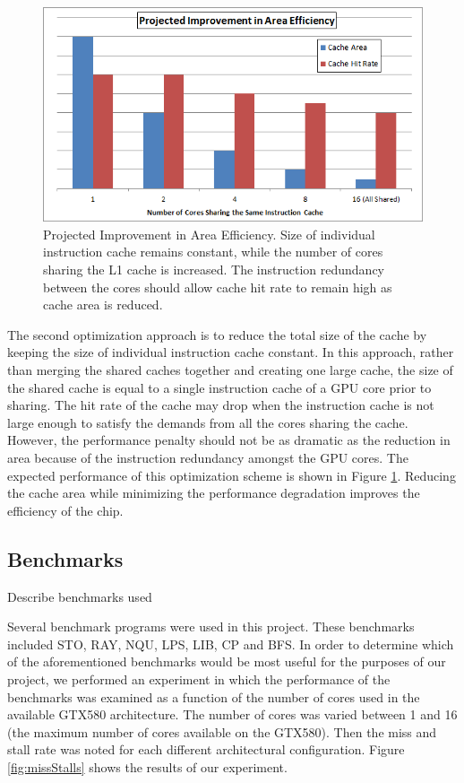 \begin{figure}[b!]
\centering
\includegraphics[width=\columnwidth]{graphics/AreaEff.png}
\caption{Projected Improvement in Area Efficiency. Size of individual instruction 
cache remains constant, while the number of cores sharing the L1 cache is increased.
The instruction redundancy between the cores should allow cache hit rate to remain
high as cache area is reduced. }
\label{AreaEff}
\end{figure}


The second optimization approach is to reduce the total size 
of the cache by keeping the size of individual instruction cache constant. 
In this approach, rather than merging the shared caches together and 
creating one large cache, the size of the shared cache is equal to 
a single instruction cache of a GPU core prior to sharing. 
The hit rate of the cache may drop when the instruction cache is not
large enough to satisfy the demands from all the cores sharing the cache.
However, the performance penalty should not be as dramatic as the reduction in area
because of the instruction redundancy amongst the GPU cores. 
The expected performance of this optimization scheme is shown in Figure \ref{AreaEff}.
Reducing the cache area while minimizing the performance degradation improves the
efficiency of the chip.


\subsection{Benchmarks}
Describe benchmarks used 

Several benchmark programs were used in this project. 
These benchmarks included STO, RAY, NQU, LPS, LIB, CP and BFS. 
In order to determine which of the aforementioned benchmarks would be
most useful for the purposes of our project, we performed an
experiment in which the performance of the benchmarks was examined as
a function of the number of cores used in the available GTX580
architecture. 
The number of cores was varied between 1 and 16 (the maximum number of
cores available on the GTX580). 
Then the miss and stall rate was noted for each different
architectural configuration. 
Figure \ref{fig:missStalls} shows the results of our experiment. 

